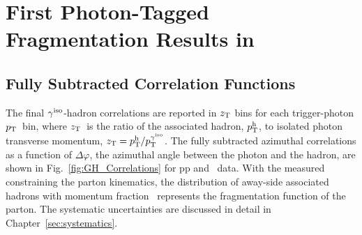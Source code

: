 







\chapter{First Photon-Tagged Fragmentation Results in \pPb}

\section{Fully Subtracted Correlation Functions}
\label{sec:decaybkgsubtraction}
The final $ \gamma^\mathrm{iso}$-hadron correlations are reported in $z_{\mathrm{T}}$  bins for each trigger-photon $p_{\mathrm{T}}$~bin, where $z_{\mathrm{T}}$~is the ratio of the associated hadron, $p_{\mathrm{T}}^\mathrm{h}$, to isolated photon transverse momentum, $z_{\mathrm{T}} = p_{\mathrm{T}}^{\mathrm{h}}/p_{\mathrm{T}}^{\gamma^\mathrm{iso}}$. The fully subtracted azimuthal correlations as a function of $ \Delta\varphi$, the azimuthal angle between the photon and the hadron, are shown in Fig.~\ref{fig:GH_Correlations} for pp and \pPb~data. With the measured \gammaiso~ constraining the parton kinematics, the distribution of away-side associated hadrons with momentum fraction \zt~represents the fragmentation function of the parton. The systematic uncertainties are discussed in detail in Chapter~\ref{sec:systematics}.

